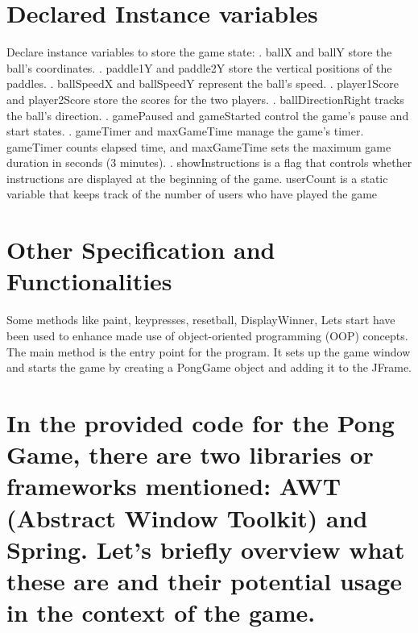 \documentclass[16pt]{article}
\begin{document}
\section*{Declared Instance variables}
\begin{flushleft}
\Large Declare instance variables to store the game state:
. ballX and ballY store the ball's coordinates.
. paddle1Y and paddle2Y store the vertical positions of the paddles.
. ballSpeedX and ballSpeedY represent the ball's speed.
. player1Score and player2Score store the scores for the two players.
. ballDirectionRight tracks the ball's direction.
. gamePaused and gameStarted control the game's pause and start states.
. gameTimer and maxGameTime manage the game's timer. gameTimer counts elapsed time, and maxGameTime sets the maximum game duration in seconds (3 minutes).
. showInstructions is a flag that controls whether instructions are displayed at the beginning of the game.
\newline userCount is a static variable that keeps track of the number of users who have played the game
\end{flushleft}

\section*{Other Specification and Functionalities}
\begin{flushleft}
\Large Some methods like paint, keypresses, resetball, DisplayWinner, Lets start have been used to enhance made use of object-oriented programming (OOP) concepts.
\newline The main method is the entry point for the program. It sets up the game window and starts the game by creating a PongGame object and adding it to the JFrame.
\end{flushleft}

\newpage

\section*{In the provided code for the Pong Game, there are two libraries or frameworks mentioned: AWT (Abstract Window Toolkit) and Spring. Let's briefly overview what these are and their potential usage in the context of the game.}
\end{document}
